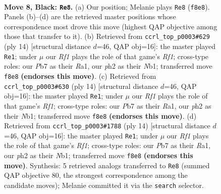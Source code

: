 \documentclass[11pt]{article}
\begin{document}
\begin{figure}[p]\centering
\begin{subfigure}{0.46\textwidth}\centering
\resizebox{\linewidth}{!}{%
\newchessgame
\chessboard[
  setfen={rnbq1rk1/ppp1bppp/4p3/3n4/2NP4/6P1/PP2PPBP/RNBQ1RK1 b - - 0 8},
  showmover=false,
  pgfstyle=straightmove, color=movearrow, markmove={f8-e8}
]}
\caption{}
\end{subfigure}\hfill
\begin{subfigure}{0.46\textwidth}\centering
\resizebox{\linewidth}{!}{%
\newchessgame
\chessboard[
  setfen={rnbq1rk1/ppp1bppp/8/3p4/3Pn3/3B1N2/PPP2PPP/RNBQ1RK1 w - - 4 8},
  showmover=false,
  pgfstyle=straightmove, color=movearrow, markmove={f1-e1}
]}
\caption{}
\end{subfigure}
\\[4pt]
\begin{subfigure}{0.46\textwidth}\centering
\resizebox{\linewidth}{!}{%
\newchessgame
\chessboard[
  setfen={rnbq1rk1/ppp1bppp/8/3p4/3Pn3/3B1N2/PPP2PPP/RNBQ1RK1 w - - 4 8},
  showmover=false,
  pgfstyle=straightmove, color=movearrow, markmove={f1-e1}
]}
\caption{}
\end{subfigure}\hfill
\begin{subfigure}{0.46\textwidth}\centering
\resizebox{\linewidth}{!}{%
\newchessgame
\chessboard[
  setfen={rnbq1rk1/ppp1bppp/8/3p4/3Pn3/3B1N2/PPP2PPP/RNBQ1RK1 w - - 4 8},
  showmover=false,
  pgfstyle=straightmove, color=movearrow, markmove={f1-e1}
]}
\caption{}
\end{subfigure}
\caption{\textbf{Move 8, Black: \texttt{Re8}.} (a) Our position; Melanie plays \texttt{Re8} (\texttt{f8e8}). Panels (b)--(d) are the retrieved master positions whose correspondence most drove this move (highest QAP objective among those that transfer to it). (b) Retrieved from \texttt{ccrl\_top\_p0003\#629} (ply 14) [structural distance $d$=46, QAP obj=16]: the master played \texttt{Re1}; under $\mu$ our \emph{Rf1} plays the role of that game's \emph{Rf1}; cross-type roles: our \emph{P}b7 as their \emph{R}a1, our \emph{p}h2 as their \emph{N}b1; transferred move \texttt{f8e8} \textbf{(endorses this move)}. (c) Retrieved from \texttt{ccrl\_top\_p0003\#630} (ply 14) [structural distance $d$=46, QAP obj=16]: the master played \texttt{Re1}; under $\mu$ our \emph{Rf1} plays the role of that game's \emph{Rf1}; cross-type roles: our \emph{P}b7 as their \emph{R}a1, our \emph{p}h2 as their \emph{N}b1; transferred move \texttt{f8e8} \textbf{(endorses this move)}. (d) Retrieved from \texttt{ccrl\_top\_p0003\#1788} (ply 14) [structural distance $d$=46, QAP obj=16]: the master played \texttt{Re1}; under $\mu$ our \emph{Rf1} plays the role of that game's \emph{Rf1}; cross-type roles: our \emph{P}b7 as their \emph{R}a1, our \emph{p}h2 as their \emph{N}b1; transferred move \texttt{f8e8} \textbf{(endorses this move)}. Synthesis: 5 retrieved analogs transferred to \texttt{Re8} (summed QAP objective 80, the strongest correspondence among the candidate moves); Melanie committed it via the \texttt{search} selector.}
\label{fig:thought-m15}
\end{figure}
\end{document}
